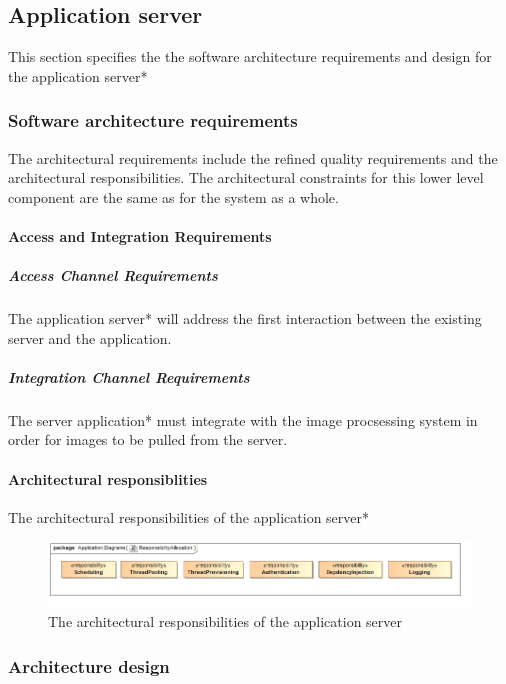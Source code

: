 \documentclass[a4paper,12pt]{report}
\begin{document}
	\subsection {Application server}
	This section specifies the the software architecture requirements and design for the application server*
		\subsubsection {Software architecture requirements}
		The architectural requirements include the refined quality requirements and the architectural responsibilities. The architectural constraints for this lower level component are the same as for the system as a whole.
		
			\paragraph {Access and Integration Requirements}
				\subparagraph {Access Channel Requirements}
					The application server* will address the first interaction between the existing server and the application. 
				\subparagraph {Integration Channel Requirements}
					The server application* must integrate with the image procsessing system in order for images to be pulled from the server.	
			
			\FloatBarrier
			\paragraph {Architectural responsiblities}
				\hfill \break
				The architectural responsibilities of the 	application server*
				\begin{figure}[H]
					\centering
					\includegraphics  [scale=0.5]{../Diagrams/applicationServerResponsibiltiesZ.png}
					\caption{The architectural responsibilities of the application server}
				\end{figure}		
		
		\subsubsection {Architecture design}	
			\FloatBarrier	
\end{document}
